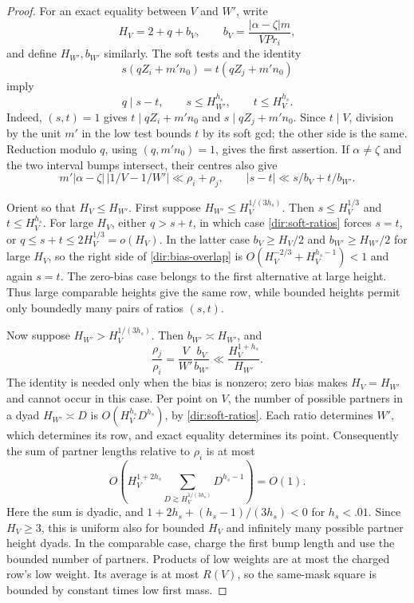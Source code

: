 \begin{proof}
For an exact equality between $V$ and $W'$, write
\[
 H_V=2+q+b_V,\qquad
 b_V=\frac{|\alpha-\zeta|m}{VP r_i},
\]
and define $H_{W'},b_{W'}$ similarly. The soft tests and the identity
\[
 s(qZ_i+m'n_0)=t(qZ_j+m'n_0)
\]
imply
\begin{equation}\label{dir:soft-ratios}
 q\mid s-t,\qquad
 s\le H_{W'}^{h_s},\qquad t\le H_V^{h_s}.
\end{equation}
Indeed, $(s,t)=1$ gives $t\mid qZ_i+m'n_0$ and
$s\mid qZ_j+m'n_0$. Since $t\mid V$, division by the unit $m'$ in the
low test bounds $t$ by its soft gcd; the other side is the same.
Reduction modulo $q$, using $(q,m'n_0)=1$, gives the first assertion.
If $\alpha\ne\zeta$ and the two interval bumps intersect, their centres
also give
\begin{equation}\label{dir:bias-overlap}
 m'|\alpha-\zeta|\,|1/V-1/W'|\ll\rho_i+\rho_j,
 \qquad
 |s-t|\ll s/b_V+t/b_{W'}.
\end{equation}

Orient so that $H_V\le H_{W'}$. First suppose
$H_{W'}\le H_V^{1/(3h_s)}$. Then
$s\le H_V^{1/3}$ and $t\le H_V^{h_s}$. For large $H_V$, either
$q>s+t$, in which case \eqref{dir:soft-ratios} forces $s=t$, or
$q\le s+t\le2H_V^{1/3}=o(H_V)$. In the latter case
$b_V\ge H_V/2$ and $b_{W'}\ge H_{W'}/2$ for large $H_V$, so the
right side of \eqref{dir:bias-overlap} is
$O(H_V^{-2/3}+H_V^{h_s-1})<1$ and again $s=t$.
The zero-bias case belongs to the first alternative at large height.
Thus large comparable heights give the same row, while bounded heights
permit only boundedly many pairs of ratios $(s,t)$.

Now suppose $H_{W'}>H_V^{1/(3h_s)}$. Then $b_{W'}\asymp H_{W'}$,
and
\begin{equation}\label{dir:disparate-widths}
 \frac{\rho_j}{\rho_i}
   =\frac{V}{W'}\frac{b_V}{b_{W'}}
   \ll\frac{H_V^{1+h_s}}{H_{W'}}.
\end{equation}
The identity is needed only when the bias is nonzero; zero bias makes
$H_V=H_{W'}$ and cannot occur in this case. Per point on $V$, the number
of possible partners in a dyad $H_{W'}\asymp D$ is
$O(H_V^{h_s}D^{h_s})$, by \eqref{dir:soft-ratios}. Each ratio determines
$W'$, which determines its row, and exact equality determines its point.
Consequently the sum of partner lengths relative to $\rho_i$ is at most
\[
 O\left(
 H_V^{1+2h_s}
 \sum_{D\gtrsim H_V^{1/(3h_s)}}D^{h_s-1}
 \right)=O(1).
\]
Here the sum is dyadic, and
$1+2h_s+(h_s-1)/(3h_s)<0$ for $h_s<.01$. Since $H_V\ge3$, this is
uniform also for bounded $H_V$ and infinitely many possible partner
height dyads. In the comparable case,
charge the first bump length and use the bounded number of partners.
Products of low weights are at most the charged row's low weight.
Its average is at most $R(V)$, so the same-mask square is bounded by
constant times low first mass.


\end{proof}
